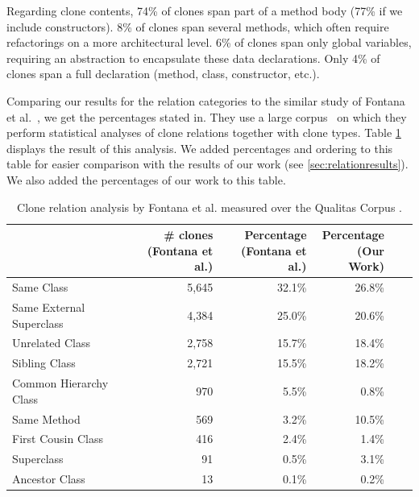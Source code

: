 \documentclass[runningheads]{llncs}
\begin{document}
Regarding clone contents, 74\% of clones span part of a method body (77\% if we include constructors). 8\% of clones span several methods, which often require refactorings on a more architectural level. 6\% of clones span only global variables, requiring an abstraction to encapsulate these data declarations. Only 4\% of clones span a full declaration (method, class, constructor, etc.).

Comparing our results for the relation categories to the similar study of Fontana et al.~\cite{fontana2012duplicated, fontana2015duplicated}, we get the percentages stated in. They use a large corpus~\cite{tempero2010qualitas} on which they perform statistical analyses of clone relations together with clone types. Table \ref{tab:dcra-relation} displays the result of this analysis. We added percentages and ordering to this table for easier comparison with the results of our work (see \ref{sec:relationresults}). We also added the percentages of our work to this table.

\begin{table}[H]
\centering
\begin{tabular}{@{}lrrrrr@{}}
\toprule
                         & \makecell{# clones\\(Fontana et al.)} & \makecell{Percentage\\(Fontana et al.)} & \makecell{Percentage\\(Our Work)} \\ \midrule
Same Class               & 5,645  & 32.1\%     & 26.8\%    \\
Same External Superclass & 4,384  & 25.0\%     & 20.6\%   \\
Unrelated Class          & 2,758  & 15.7\%     & 18.4\%    \\
Sibling Class            & 2,721  & 15.5\%     & 18.2\%    \\
Common Hierarchy Class   & 970    & 5.5\%      & 0.8\%    \\
Same Method              & 569    & 3.2\%      & 10.5\%    \\
First Cousin Class       & 416    & 2.4\%      & 1.4\%    \\
Superclass               & 91     & 0.5\%      & 3.1\%    \\
Ancestor Class           & 13     & 0.1\%      & 0.2\%    \\ \bottomrule
\end{tabular}
\caption{Clone relation analysis by Fontana et al. \cite{fontana2012duplicated} measured over the Qualitas Corpus \cite{tempero2010qualitas}.}
\label{tab:dcra-relation}
\end{table}
\end{document}
